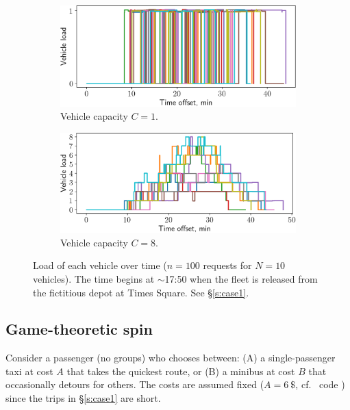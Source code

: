 \documentclass[12pt,notitlepage]{article}
\begin{document}
\begin{figure}[!p]
	\begin{subfigure}{0.5\textwidth}
		\includegraphics[width=\textwidth]{20210616-OPT1/c_grid_study0/UTC-20210619-074952/c_grid_visualize/8/vehicle_load}
		\caption{Vehicle capacity $C = 1$.}
	\end{subfigure}
	\begin{subfigure}{0.5\textwidth}
		\includegraphics[width=\textwidth]{20210616-OPT1/c_grid_study0/UTC-20210619-074952/c_grid_visualize/9/vehicle_load}
		
		\caption{Vehicle capacity $C = 8$.}
	\end{subfigure}
	
	\caption{%
		Load of each vehicle over time
		($n = 100$ requests for $N = 10$ vehicles).
		The time begins at $\sim$17:50 
		when the fleet is released 
		from the fictitious depot
		at Times Square.
		See \S\ref{s:case1}.
	}
	\label{f:case1-load}
\end{figure}




\subsection{Game-theoretic spin} \label{s:game1}

Consider a passenger
(no groups)
who chooses between: 
(A) a single-passenger taxi at cost $A$ that takes the quickest route,
or
(B) a minibus at cost $B$ that occasionally detours for others.
%
%
%
%
%
The costs are assumed fixed
($A = \SI{6}{\$}$, cf.~%
code )
since the trips in \S\ref{s:case1} are short.
\end{document}
